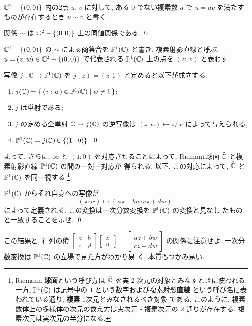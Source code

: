 \documentclass[12pt,twoside]{jarticle}
\begin{document}
${\mathbb C}^2-\{(0,0)\}$ 内の2点 $u$, $v$ に対して, ある $0$ でない複素数 $a$ 
で $u=av$ を満たすものが存在するとき $u\sim v$ と書く. 

\begin{question}[容易, 5点]
  関係 $\sim$ は ${\mathbb C}^2-\{(0,0)\}$ 上の同値関係である. \qed
\end{question}

\noindent ${\mathbb C}^2-\{(0,0)\}$ の $\sim$ による商集合を ${\mathbb P}^1({\mathbb C})$ と書き, 
複素射影直線と呼ぶ. $u=(z,w)\in{\mathbb C}^2-\{(0,0)\}$ で代表される ${\mathbb P}^1({\mathbb C})$ 
上の点を $(z:w)$ と表わす. 

\begin{question}
  写像 $j:{\mathbb C}\to{\mathbb P}^1({\mathbb C})$ を $j(z)=(z:1)$ と定めると以下が成立する:
  \begin{enumerate}
  \item $j({\mathbb C}) = \{\,(z:w)\in{\mathbb P}^1({\mathbb C})\mid w\ne0\,\}$; 
  \item $j$ は単射である; 
  \item $j$ の定める全単射 ${\mathbb C}\to j({\mathbb C})$ の逆写像は %
    $(z:w)\mapsto z/w$ によって与えられる;
  \item ${\mathbb P}^1({\mathbb C})=j({\mathbb C})\cup\{(1:0)\}$. 
    \qed
  \end{enumerate}
\end{question}

\noindent よって, さらに, $\infty$ と $(1:0)$ を対応させることによって,
Riemann球面 $\widehat{{\mathbb C}}$ と複素射影直線 ${\mathbb P}^1({\mathbb C})$ の間の一対一対応が
得られる. 以下, この対応によって, $\widehat{{\mathbb C}}$ と ${\mathbb P}^1({\mathbb C})$
を同一視する%
%
\footnote{Riemann {\bf 球面}という呼び方は $\widehat{{\mathbb C}}$ を{\bf 実} 2
  次元の対象とみなすときに使われる. %
  一方, ${\mathbb P}^1({\mathbb C})$ は記号中の $1$ という数字および複素射影{\bf 直線}
  という呼び名に表われている通り, {\bf 複素} 1次元とみなされるべき対象
  である. %
  このように, 複素数体上の多様体の次元の数え方は実次元・複素次元の
  2 通りが存在する. 複素次元は実次元の半分になる. }.  
%

\begin{question}
  ${\mathbb P}^1({\mathbb C})$ からそれ自身への写像が
  \[
    (z:w) \mapsto (az + bw : cz + dw).
  \]
  によって定義される. この変換は一次分数変換を ${\mathbb P}^1({\mathbb C})$ の変換と見なし
  たものと一致することを示せ. \qed
\end{question}

\noindent この結果と, 行列の積 
\(
  \begin{bmatrix} a & b \\ c & d \end{bmatrix}
  \begin{bmatrix} z \\ w \end{bmatrix}
  =
  \begin{bmatrix} az + bw \\ cz + dw \end{bmatrix}
\)
の関係に注意せよ. 一次分数変換は ${\mathbb P}^1({\mathbb C})$ の立場で見た方がわかり易
く, 本質もつかみ易い. 
\end{document}
